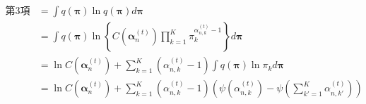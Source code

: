 \documentclass{jsarticle}%
\theoremstyle{definition}
\begin{document}
\begin{align}
    第3項 & =\int q(\bm{\pi})\ln q(\bm{\pi})d\bm{\pi}                                                                                                                       \\
          & =\int q(\bm{\pi})\ln\left\{C(\boldsymbol{\alpha}_{n}^{(t)})\prod_{k=1}^K \pi^{\alpha_{n,k}^{(t)}-1}_{k}\right\}d\bm{\pi}                                        \\
          & =\ln C(\boldsymbol{\alpha}_{n}^{(t)})+\sum^K_{k=1}(\alpha_{n,k}^{(t)}-1)\int q(\bm{\pi})\ln \pi_{k}d\bm{\pi}                                                    \\
          & =\ln C(\boldsymbol{\alpha}_{n}^{(t)})+\sum^K_{k=1}(\alpha_{n,k}^{(t)}-1)\left(\psi(\alpha^{(t)}_{n,k})-\psi\left(\sum^K_{k'=1}\alpha^{(t)}_{n,k'}\right)\right)
\end{align}
\end{document}
